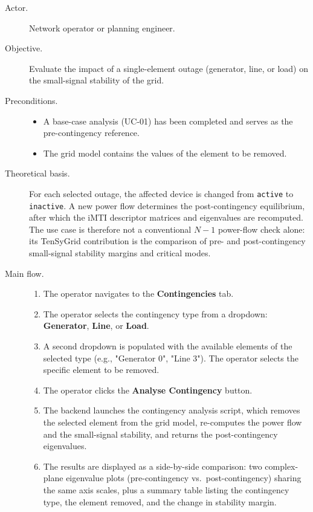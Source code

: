 \begin{description}
  \item[Actor.] Network operator or planning engineer.
  \item[Objective.] Evaluate the impact of a single-element outage (generator, line, or load) on the small-signal stability of the grid.
  \item[Preconditions.]
        \begin{itemize}[before=\leavevmode, leftmargin=*]
          \item A base-case analysis (UC-01) has been completed and serves as the pre-contingency reference.
          \item The grid model contains the values of the element to be removed.
        \end{itemize}
  \item[Theoretical basis.] For each selected outage, the affected device is changed from \texttt{active} to \texttt{inactive}. A new power flow determines the post-contingency equilibrium, after which the iMTI descriptor matrices and eigenvalues are recomputed. The use case is therefore not a conventional $N-1$ power-flow check alone: its TenSyGrid contribution is the comparison of pre- and post-contingency small-signal stability margins and critical modes.
  \item[Main flow.]
        \begin{enumerate}[before=\leavevmode, leftmargin=*]
          \item The operator navigates to the \textbf{Contingencies} tab.
          \item The operator selects the contingency type from a dropdown: \textbf{Generator}, \textbf{Line}, or \textbf{Load}.
          \item A second dropdown is populated with the available elements of the selected type (e.g., "Generator 0", "Line 3"). The operator selects the specific element to be removed.
          \item The operator clicks the \textbf{Analyse Contingency} button.
          \item The backend launches the contingency analysis script, which removes the selected element from the grid model, re-computes the power flow and the small-signal stability, and returns the post-contingency eigenvalues.
          \item The results are displayed as a side-by-side comparison: two complex-plane eigenvalue plots (pre-contingency vs.~post-contingency) sharing the same axis scales, plus a summary table listing the contingency type, the element removed, and the change in stability margin.

\end{enumerate}
\end{description}
